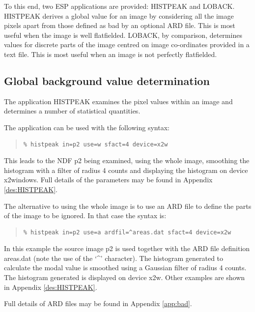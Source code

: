 \documentclass[twoside,11pt]{article}
\newcommand{\xlabel}[1]{}
\newenvironment{myquote}{\begin{quote}\begin{small}}{\end{small}\end{quote}}
\begin{document}
To this end, two ESP applications are provided: HISTPEAK and LOBACK.
HISTPEAK derives a global value for an image by considering all the
image pixels apart from those defined as bad by an optional ARD
file. This is most useful when the image is well flatfielded. LOBACK,
by comparison, determines values for discrete parts of the image
centred on image co-ordinates provided in a text file. This is most
useful when an image is not perfectly flatfielded.

\subsection{Global background value determination}
\xlabel{GLOBALBACKGROUNDS}

The application HISTPEAK examines the pixel values within an image
and determines a number of statistical quantities.

The application can be used with the following syntax:

\begin{myquote}
\begin{verbatim}
% histpeak in=p2 use=w sfact=4 device=x2w
\end{verbatim}
\end{myquote}

This leads to the NDF p2 being examined, using the whole image, smoothing 
the histogram with a filter of radius 4 counts and displaying the histogram on
device x2windows. Full details of the parameters may be found in Appendix 
\ref{des:HISTPEAK}.

The alternative to using the whole image is to use an ARD file to define the
parts of the image to be ignored. In that case the syntax is:

\begin{myquote}
\begin{verbatim}
% histpeak in=p2 use=a ardfil=^areas.dat sfact=4 device=x2w
\end{verbatim}
\end{myquote}

In this example the source image p2 is used together with the 
ARD file definition areas.dat (note the use of the `\^{ }' character). 
The histogram generated to 
calculate the modal value is smoothed using a Gaussian filter 
of radius 4 counts. The histogram generated is displayed on 
device x2w. Other examples are shown in Appendix \ref{des:HISTPEAK}.

Full details of ARD files may be found in Appendix \ref{app:bad}.
\end{document}
